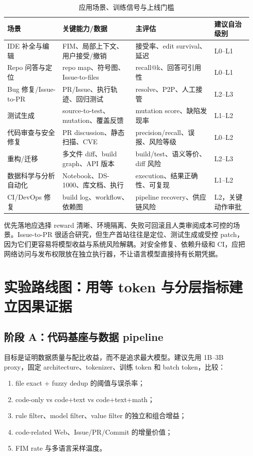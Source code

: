 \documentclass[10pt,a4paper,UTF8,fontset=none]{ctexart}
\begin{document}
\begin{table}[htbp]
\centering
\caption{应用场景、训练信号与上线门槛}
\label{tab:applications}
\small
\begin{tabularx}{\textwidth}{p{3.0cm}YYY}
\toprule
场景 & 关键能力/数据 & 主评估 & 建议自治级别 \\
\midrule
IDE 补全与编辑 & FIM、局部上下文、用户接受/撤销 & 接受率、edit survival、延迟 & L0--L1 \\
Repo 问答与定位 & repo map、符号图、Issue-to-files & recall@k、回答可引用性 & L0--L1 \\
Bug 修复/Issue-to-PR & PR/Issue、执行轨迹、回归测试 & resolve、P2P、人工接管 & L2--L3 \\
测试生成 & source-to-test、mutation、覆盖反馈 & mutation score、缺陷发现率 & L1--L2 \\
代码审查与安全修复 & PR discussion、静态扫描、CVE & precision/recall、误报、风险等级 & L0--L2 \\
重构/迁移 & 多文件 diff、build graph、API 版本 & build/test、语义等价、diff 风险 & L2--L3 \\
数据科学与分析自动化 & Notebook、DS-1000、库文档、执行 & execution、结果正确性、可复现 & L1--L2 \\
CI/DevOps 修复 & build log、workflow、依赖图 & pipeline recovery、供应链风险 & L2，关键动作审批 \\
\bottomrule
\end{tabularx}
\end{table}

优先落地应选择 reward 清晰、环境隔离、失败可回滚且人类审阅成本可控的场景。Issue-to-PR 很适合研究，但生产首站往往是定位、测试生成或受控 patch，因为它们更容易将模型收益与系统风险解耦。对安全修复、依赖升级和 CI，应把网络访问与发布权限放在独立执行器，不让语言模型直接持有长期凭据。

\section{实验路线图：用等 token 与分层指标建立因果证据}

\subsection{阶段 A：代码基座与数据 pipeline}

目标是证明数据质量与配比收益，而不是追求最大模型。建议先用 1B--3B proxy，固定 architecture、tokenizer、训练 token 和 batch token，比较：

\begin{enumerate}
  \item file exact + fuzzy dedup 的阈值与误杀率；
  \item code-only vs code+text vs code+text+math；
  \item rule filter、model filter、value filter 的独立和组合增益；
  \item code-related Web、Issue/PR/Commit 的增量价值；
  \item FIM rate 与多语言采样温度。
\end{enumerate}
\end{document}
